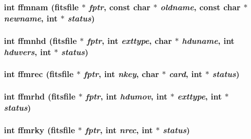 \subsubsection{\setlength{\rightskip}{0pt plus 5cm}int ffmnam (\bf{fitsfile} $\ast$ {\em fptr}, const char $\ast$ {\em oldname}, const char $\ast$ {\em newname}, int $\ast$ {\em status})}\label{fitsio__64_8h_b7f97743a5818de567c3815c43852711}


\subsubsection{\setlength{\rightskip}{0pt plus 5cm}int ffmnhd (\bf{fitsfile} $\ast$ {\em fptr}, int {\em exttype}, char $\ast$ {\em hduname}, int {\em hduvers}, int $\ast$ {\em status})}\label{fitsio__64_8h_84dd226ce5315b62afba4631346d486f}


\subsubsection{\setlength{\rightskip}{0pt plus 5cm}int ffmrec (\bf{fitsfile} $\ast$ {\em fptr}, int {\em nkey}, char $\ast$ {\em card}, int $\ast$ {\em status})}\label{fitsio__64_8h_64f0b7aa1396fb5dc63502db966f8acd}


\subsubsection{\setlength{\rightskip}{0pt plus 5cm}int ffmrhd (\bf{fitsfile} $\ast$ {\em fptr}, int {\em hdumov}, int $\ast$ {\em exttype}, int $\ast$ {\em status})}\label{fitsio__64_8h_d81f4e1c55fec210faa6343d3ed455ce}


\subsubsection{\setlength{\rightskip}{0pt plus 5cm}int ffmrky (\bf{fitsfile} $\ast$ {\em fptr}, int {\em nrec}, int $\ast$ {\em status})}\label{fitsio__64_8h_d22c9244b2bef12cd893ff4e514f49fb}


